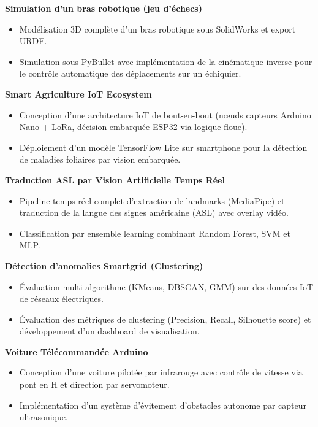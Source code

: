 \documentclass[10pt,a4paper]{altacv}
\renewcommand{\divider}{\textcolor{body!30}{\hdashrule{\linewidth}{0.6pt}{0.5ex}}\smallskip}
\begin{document}
{\large\bfseries\color{accent} Simulation d'un bras robotique (jeu d'échecs)}\\[0.05cm]
\begin{itemize}
  \item Modélisation 3D complète d'un bras robotique sous SolidWorks et export URDF.
  \item Simulation sous PyBullet avec implémentation de la cinématique inverse pour le contrôle automatique des déplacements sur un échiquier.
\end{itemize}
\divider

{\large\bfseries\color{accent} Smart Agriculture IoT Ecosystem}\\[0.05cm]
\begin{itemize}
  \item Conception d'une architecture IoT de bout-en-bout (nœuds capteurs Arduino Nano + LoRa, décision embarquée ESP32 via logique floue).
  \item Déploiement d'un modèle TensorFlow Lite sur smartphone pour la détection de maladies foliaires par vision embarquée.
\end{itemize}
\divider

{\large\bfseries\color{accent} Traduction ASL par Vision Artificielle Temps Réel}\\[0.05cm]
\begin{itemize}
  \item Pipeline temps réel complet d'extraction de landmarks (MediaPipe) et traduction de la langue des signes américaine (ASL) avec overlay vidéo.
  \item Classification par ensemble learning combinant Random Forest, SVM et MLP.
\end{itemize}
\divider

{\large\bfseries\color{accent} Détection d'anomalies Smartgrid (Clustering)}\\[0.05cm]
\begin{itemize}
  \item Évaluation multi-algorithme (KMeans, DBSCAN, GMM) sur des données IoT de réseaux électriques.
  \item Évaluation des métriques de clustering (Precision, Recall, Silhouette score) et développement d'un dashboard de visualisation.
\end{itemize}
\divider

{\large\bfseries\color{accent} Voiture Télécommandée Arduino}\\[0.05cm]
\begin{itemize}
  \item Conception d'une voiture pilotée par infrarouge avec contrôle de vitesse via pont en H et direction par servomoteur.
  \item Implémentation d'un système d'évitement d'obstacles autonome par capteur ultrasonique.
\end{itemize}
\end{document}
